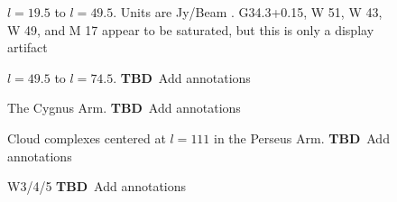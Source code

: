 \documentclass[12pt,preprint]{aastex}
\newcommand{\TBD}{{\bf TBD}}
\begin{document}
\addtocounter{figure}{-1}
\addtocounter{subfig}{1}

\begin{figure}
  \begin{minipage}{6.5in} 
    \begin{center}
      \caption{$l=19.5$ to $l=49.5$.  Units are Jy/Beam .  G34.3+0.15, W
	51, W 43, W 49, and M 17 appear to be saturated, but this is
	only a display artifact}
    \end{center}
  \end{minipage}
\end{figure}

\addtocounter{figure}{-1}
\addtocounter{subfig}{1}

\begin{figure}
  \begin{minipage}{6.5in} 
    \begin{center}
      \caption{$l=49.5$ to $l=74.5$.  \TBD\ Add annotations}
    \end{center}
  \end{minipage}
\end{figure}

\addtocounter{figure}{-1}
\addtocounter{subfig}{1}

\begin{figure}
  \hspace{-1in}
  \caption{The Cygnus Arm. \TBD\ Add annotations}
\end{figure}

\addtocounter{figure}{-1}
\addtocounter{subfig}{1}

\begin{figure}
\hspace{-0.5in}
  \caption{Cloud complexes centered at $l=111$ in the Perseus Arm. \TBD\ Add annotations}
\end{figure}

\addtocounter{figure}{-1}
\addtocounter{subfig}{1}

\begin{figure}
  \hspace{-1in}
  \caption{W3/4/5 \TBD\ Add annotations}
\end{figure}

\renewcommand{\thefigure}{\arabic{figure}}
\end{document}
